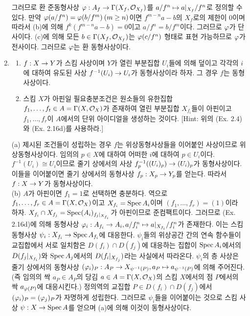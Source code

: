 \begin{enumerate}[label=\tb{2.\arabic*.},itemindent=0mm,itemsep=4mm]
	그러므로 환 준동형사상 $\varphi:A_f\rightarrow\Gamma(X_f,\mathcal{O}_{X_f})$를 $a/f^n\mapsto a|_{X_f}/f^n$로 정의할 수 있다.
	만약 $\varphi(a/f^n)=\varphi(b/f^m)\:(m\ge n)$이면 $f^{m-n}a-b$의 $X_f$로의 제한이 0이며
	따라서 (b)에 의해 $f^k(f^{m-n}a-b)=0$이고 $a/f^n=b/f^m$이다. 그러므로 $\varphi$가 단사이다.
	(c)에 의해 모든 $b\in\Gamma(X_f,\mathcal{O}_{X_f})$는 $\varphi(c/f^n)$ 형태로 표현 가능하므로 $\varphi$가 전사이다.
	그러므로 $\varphi$는 환 동형사상이다.
	\item {}
	\begin{enumerate}[label=(\alph*)]
	\item $f:X\rightarrow Y$가 스킴 사상이며 $Y$가 열린 부분집합 $U_i$들에 의해 덮이고
	각각의 $i$에 대하여 유도된 사상 $f^{-1}(U_i)\rightarrow U_i$가 동형사상이라 하자. 그 경우 $f$는 동형사상이다.
	\item 스킴 $X$가 아핀일 필요충분조건은 원소들의 유한집합 $f_1,\ldots,f_t\in A=\Gamma(X,\mathcal{O}_X)$가 존재하여
	열린 부분집합 $X_{f_i}$들이 아핀이고 $f_1,\ldots,f_r$이 $A$에서의 단위 아이디얼을 생성하는 것이다.
	[Hint: 위의 (Ex. 2.4)와 (Ex. 2.16d)를 사용하라.]
	\end{enumerate}
	\sol (a) 제시된 조건들이 성립하는 경우 $f$는 위상동형사상들을 이어붙인 사상이므로 위상동형사상이다.
	임의의 $p\in X$에 대하여 어떠한 $i$에 대하여 $p\in U_i$이다.
	$f^{-1}(U_i)\cong U_i$이므로 줄기 상에서의 사상 $f_p^{-1}((U_i)_p)\rightarrow(U_i)_p$가 동형사상이다.
	이들을 이어붙이면 줄기 상에서의 동형사상 $f_p:X_p\rightarrow Y_p$를 얻는다. 따라서 $f:X\rightarrow Y$가 동형사상이다.\\
	(b) $A$가 아핀이면 $f_1=1$로 선택하면 충분하다.
	역으로 $f_1,\ldots,f_r\in A=\Gamma(X,\mathcal{O}_X)$이고 $X_{f_i}=\operatorname{Spec} A_i$이며 $(f_1,\ldots,f_r)=(1)$이라 하자.
	$X_{f_i}\cap X_{f_j}=\operatorname{Spec}(A_i)_{f_j|_{X_{f_i}}}$가 아핀이므로 준컴팩트이다.
	그러므로 (Ex. 2.16d)에 의해 동형사상 $\varphi_i:A_{f_i}\rightarrow A_i,a/f_i^n\mapsto a|_{X_{f_i}}/f_i^n$가 존재한다.
	이는 스킴 동형사상 $\psi_i:X_{f_i}\rightarrow\operatorname{Spec} A_{f_i}$에 대응한다.
	$\psi_i$들의 위상공간 간의 연속 함수들이 교집합에서 서로 일치함은 $D(f_i)\cap D(f_j)$에 대응하는 집합이
	$\operatorname{Spec} A_i$에서의 $D(f_j|_{X_{f_i}})$와 $\operatorname{Spec} A_j$에서의 $D(f_i|_{X_{f_j}})$라는 사실에서 따라온다.
	$\psi_i$의 층 사상은 줄기 상에서의 동형사상 $(\varphi_i)_P:A_P\rightarrow X_{\psi^{-1}(P)},a_P\mapsto a_{\psi^{-1}(P)}$에 의해 주어진다.
	(즉 임의의 싹 $a_P\in A_P$의 당김 $a\in A=\Gamma(X,\mathcal{O}_X)$의 스킴 $X$에서의 점 $P$에서의 싹 $a_{\varphi(P)}$에 대응시킨다.)
	정의역의 교집합 $P\in D(f_i)\cap D(f_j)$에서 $(\varphi_i)_P=(\varphi_j)_P$가 자명하게 성립한다.
	그러므로 $\psi_i$들을 이어붙이는 것으로 스킴 사상 $\psi:X\rightarrow\operatorname{Spec} A$를 얻으며 (a)에 의해 이것이 동형사상이다.

\end{enumerate}
